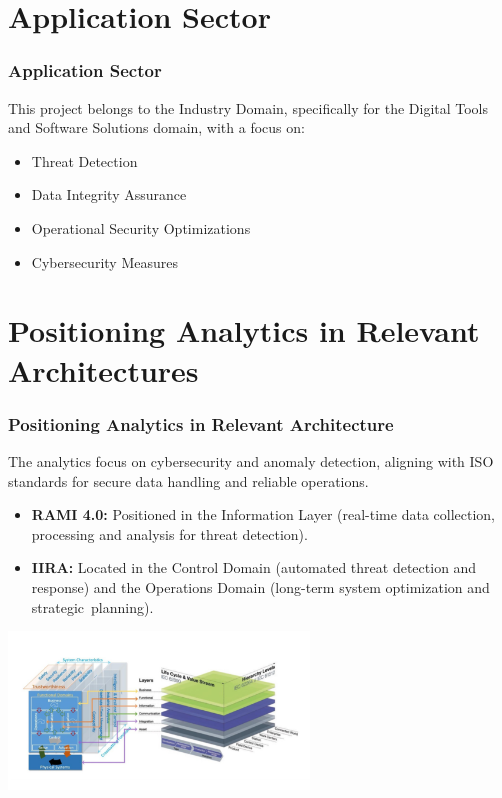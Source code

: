 \documentclass[10pt, a4paper]{beamer}
\begin{document}
\section{Application Sector}
\begin{frame}
	\frametitle{Application Sector}
	This project belongs to the Industry Domain, specifically for the Digital Tools and Software Solutions domain, with a focus on:
	
	\begin{block}{}
		\begin{itemize}
			\item Threat Detection
			\item Data Integrity Assurance
			\item Operational Security Optimizations
			\item Cybersecurity Measures
		\end{itemize}
	\end{block}
\end{frame}

\section{Positioning Analytics in Relevant Architectures}
\begin{frame}
	\frametitle{Positioning Analytics in Relevant Architecture}
The analytics focus on cybersecurity and anomaly detection, aligning with ISO standards for secure data handling and reliable operations.

	
	\begin{block}{}
		\begin{itemize}
		\item \textbf{RAMI 4.0:} Positioned in the Information Layer (real-time data collection, processing and analysis for threat detection).
		\item \textbf{IIRA:} Located in the Control Domain (automated threat detection and response) and the Operations Domain (long-term system optimization and strategic planning).
		\end{itemize}
	\end{block}
	
	\centering
	\includegraphics[width=0.6\textwidth]{images/RAMI_IIRA.png} %
	
	\centering
	
	
\end{frame}
\end{document}

